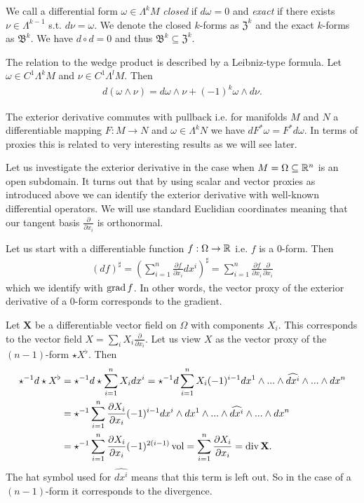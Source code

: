 \documentclass[../master_thesis.tex]{subfiles}
\begin{document}
We call a differential form $\omega \in \Lambda^k M$ 
\textit{closed} if $d\omega = 0$ and \textit{exact}
if there exists $\nu \in \Lambda^{k-1}$ s.t. $d\nu = \omega$.
We denote the closed $k$-forms as $\mathfrak{Z}^k$ and the exact 
$k$-forms as $\mathfrak{B}^k$. We have $d\circ d = 0$ and thus 
$\mathfrak{B}^k \subseteq \mathfrak{Z}^k$.

The relation to the wedge product is described by a Leibniz-type formula. 
Let $\omega \in C^1 \Lambda^k M$ and $\nu \in C^1 \Lambda^l M$. Then
\begin{align}
    d (\omega \wedge \nu) = d\omega \wedge \nu + (-1)^k \omega \wedge d\nu.
    \label{eq:leibniz_formula}
\end{align}

The exterior derivative commutes with pullback i.e. 
for manifolds $M$ and $N$ a differentiable mapping $F:M \rightarrow N$ 
and $\omega \in \Lambda^k N$ we have $dF^* \omega = F^* d\omega$. 
In terms of proxies this is related to very interesting results as we will 
see later. 


Let us investigate the exterior derivative in the case when 
$M = \Omega \subseteq \mathbb{R}^n$ is an open subdomain. It turns out that by using 
scalar and vector proxies as introduced above we can identify the exterior 
derivative with well-known differential operators. We will use standard 
Euclidian coordinates meaning that our tangent basis $\frac{\partial}{\partial x_i}$
is orthonormal. 

Let us start with a differentiable function $f: \Omega \rightarrow \mathbb{R}$ i.e. 
$f$ is a $0$-form. Then
\begin{align*}
    (df)^\sharp = \left( \sum_{i=1}^n \frac{\partial f}{\partial x_i} dx^i 
        \right)^\sharp
    = \sum_{i=1}^n \frac{\partial f}{\partial x_i} \frac{\partial}{\partial x_i}
\end{align*}
which we identify with  $\operatorname{grad} f$. In other words, the vector proxy of the 
exterior derivative of a $0$-form corresponds to the gradient.

Let $\mathbf{X}$ be a differentiable vector field on $\Omega$ 
with components $X_i$. This corresponds to the vector field 
$X = \sum_i X_i \frac{\partial}{\partial x_i}$. Let us view
$X$ as the vector proxy 
of the $(n-1)$-form $\star X^\flat$. Then 
\begin{align*}
    \star^{-1} d\star X^\flat &= \star^{-1} d\star \sum_{i=1}^n X_i dx^i
    = \star^{-1} d \sum_{i=1}^n X_i (-1)^{i-1} 
        dx^1 \wedge ... \wedge \widehat{dx^i} 
        \wedge ... 
        \wedge dx^n
    \\ &= \star^{-1} \sum_{i=1}^n \frac{\partial X_i}{\partial x_i} (-1)^{i-1} 
        dx^i \wedge 
        dx^1 \wedge ... \wedge \widehat{dx^i} \wedge ... \wedge dx^n
    \\ &= \star^{-1} \sum_{i=1}^n \frac{\partial X_i}{\partial x_i} 
        (-1)^{2(i-1)} \operatorname{vol}
    = \sum_{i=1}^n \frac{\partial X_i}{\partial x_i}
    = \operatorname{div} \mathbf{X}.
\end{align*}
The hat symbol used for
$\widehat{dx^i}$ means that this term is left out. So in the case of a $(n-1)$-form
it corresponds to the divergence.
\end{document}
